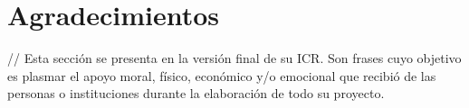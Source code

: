 \chapter*{Agradecimientos}
\begin{center}
    \thispagestyle{empty}
    \vspace*{\fill}
// Esta sección se presenta en la versión final de su ICR. Son frases cuyo objetivo es plasmar el apoyo moral, físico, económico y/o emocional que recibió de las personas o instituciones durante la elaboración de todo su proyecto.
    \vspace*{\fill}
\end{center}